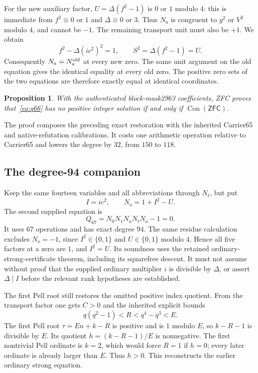 \documentclass[11pt,letterpaper]{article}
\newtheorem{proposition}[theorem]{Proposition}
\theoremstyle{definition}\newtheorem{definition}[theorem]{Definition}
\theoremstyle{remark}\newtheorem{remark}[theorem]{Remark}
\newcommand{\Con}{\operatorname{Con}}\newcommand{\ZFC}{\mathsf{ZFC}}
\begin{document}
For the new auxiliary factor, $U=\Delta(f^2-1)$ is $0$ or $1$ modulo $4$: this is immediate from $f^2\equiv0$ or $1$ and $\Delta\equiv0$ or $3$. Thus $N_a$ is congruent to $y^2$ or $V^2$ modulo $4$, and cannot be $-1$. The remaining transport unit must also be $+1$. We obtain
\[
f^2-\Delta(i c^2)^2=1,
\qquad S^2=\Delta(f^2-1)=U.
\]
Consequently $N_a=N_a^{\rm old}$ at every new zero. The same unit argument on the old equation gives the identical equality at every old zero. The positive zero sets of the two equations are therefore exactly equal at identical coordinates.

\begin{proposition}\label{prop:q66}
With the authenticated block-mask2963 coefficients, ZFC proves that~\eqref{eq:q66} has no positive integer solution if and only if $\Con(\ZFC)$.
\end{proposition}
The proof composes the preceding exact restoration with the inherited Carrier65 and native-refutation calibrations. It costs one arithmetic operation relative to Carrier65 and lowers the degree by $32$, from $150$ to $118$.

\subsection{The degree-94 companion}
Keep the same fourteen variables and all abbreviations through $N_t$, but put
\[
I=i c^2,\qquad N_o=1+I^2-U.
\]
The second supplied equation is
\begin{equation}\label{eq:q67}
\boxed{Q_{67}=N_0N_1N_aN_tN_o-1=0.}
\end{equation}
It uses $67$ operations and has exact degree $94$. The same residue calculation excludes $N_o=-1$, since $I^2\in\{0,1\}$ and $U\in\{0,1\}$ modulo $4$. Hence all five factors at a zero are $1$, and $I^2=U$. Its soundness uses the retained ordinary-strong-certificate theorem, including its squarefree descent. It must not assume without proof that the supplied ordinary multiplier $i$ is divisible by $\Delta$, or assert $\Delta\mid I$ before the relevant rank hypotheses are established.

The first Pell root still restores the omitted positive index quotient. From the transport factor one gets $C>0$ and the inherited explicit bounds
\[
q(q^2-1)<R<q^4-q^3<E.
\]
The first Pell root $\tau=En+k-R$ is positive and is $1$ modulo $E$, so $k-R-1$ is divisible by $E$. Its quotient $h=(k-R-1)/E$ is nonnegative. The first nontrivial Pell ordinate is $k=2$, which would force $R=1$ if $h=0$; every later ordinate is already larger than $E$. Thus $h>0$. This reconstructs the earlier ordinary strong equation.
\end{document}
